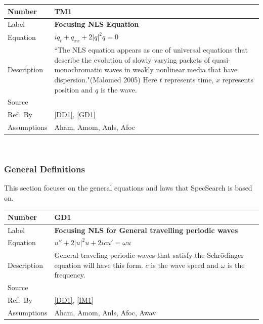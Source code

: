 \documentclass[12pt]{article}
\newcommand{\colAwidth}{0.13\textwidth}
\newcommand{\colBwidth}{0.82\textwidth}
\begin{document}
\noindent
\begin{minipage}{\textwidth} \label{T1}
	\renewcommand*{\arraystretch}{1.5}
	\begin{tabular}{| p{\colAwidth} | p{\colBwidth}|}
		\hline
		\rowcolor[gray]{0.9}
		Number& TM1\\
		\hline
		Label&\bf Focusing NLS Equation\\
		\hline
		Equation&  $iq_{t} + q_{xx} + 2|q|^{2}q=0$\\
		\hline
		Description & 
		``The NLS equation appears as one of universal equations that describe 
		the evolution of slowly varying packets of quasi-monochromatic waves in 
		weakly nonlinear media that have dispersion."(Malomed 2005) Here $t$ 
		represents time, $x$ represents position and $q$ is the wave.\\
		\hline
		Source &
		\cite{SegaletAl}\\
		\hline
		Ref.\ By & \ref{DD1}, \ref{GD1}\\
		\hline 
		Assumptions & Aham, Amom, Anls, Afoc \\
		\hline 
	\end{tabular}
\end{minipage}\\ 

\subsubsection{General Definitions}\label{sec_gendef}

This section focuses on the general equations and laws that SpecSearch is based
on. 
~\newline

\noindent
\begin{minipage}{\textwidth} \label{GD1} 
	\renewcommand*{\arraystretch}{1.5}
	\begin{tabular}{| p{\colAwidth} | p{\colBwidth}|}
		\hline
		\rowcolor[gray]{0.9}
		Number& GD1\\
		\hline
		Label&\bf Focusing NLS for General travelling periodic waves\\
		\hline
		Equation&  $ u'' + 2|u|^{2}u+2icu'=\omega u$\\
		\hline
		Description & 
		General traveling periodic waves that satisfy the Schr\"{o}dinger 
		equation 
		will have this form. $c$ is the wave speed and $\omega$ is the 
		frequency. \\
		\hline
		Source &
		\cite{SegaletAl}\\
		\hline
		Ref.\ By & \ref{DD1}, \ref{IM1}\\
		\hline 
		Assumptions & Aham, Amom, Anls, Afoc, Awav \\
		\hline 
	\end{tabular}
\end{minipage}\\ 
\end{document}
